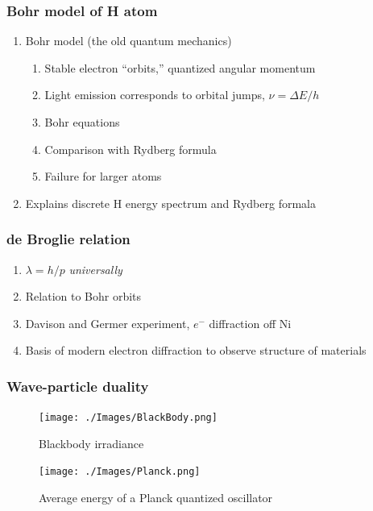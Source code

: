 \documentclass[11pt]{article}
\begin{document}
\subsubsection{Bohr model of H atom}
\label{sec:org16eed10}
\begin{enumerate}
\item Bohr model (the old quantum mechanics)
\begin{enumerate}
\item Stable electron ``orbits,'' quantized angular momentum
\item Light emission corresponds to orbital jumps, \(\nu=\Delta E/h\)
\item Bohr equations
\item Comparison with Rydberg formula
\item Failure for larger atoms
\end{enumerate}
\item Explains discrete H energy spectrum and Rydberg formala
\end{enumerate}
\subsubsection{de Broglie relation}
\label{sec:org8a24ef6}
\begin{enumerate}
\item \(\lambda=h/p\) \emph{universally}
\item Relation to Bohr orbits
\item Davison and Germer experiment, \(e^-\) diffraction off Ni
\item Basis of modern electron diffraction to observe structure of materials
\end{enumerate}
\subsubsection{Wave-particle duality}
\label{sec:orgd6c4278}

\begin{figure}[htbp]
\centering
\texttt{[image: ./Images/BlackBody.png]}
\caption{Blackbody irradiance}
\end{figure}
\begin{figure}[htbp]
\centering
\texttt{[image: ./Images/Planck.png]}
\caption{Average energy of a Planck quantized oscillator}
\end{figure}
\end{document}
